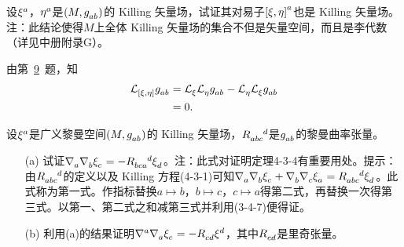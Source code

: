 \begin{xiti}
    \item 设$\tensor{\xi}{^a}$，$\tensor{\eta}{^a}$是$\left( M , \tensor{g}{_a_b}\right)$的 Killing 矢量场，试证其对易子$\tensor{\left[ \xi,\eta \right]}{^a}$也是 Killing 矢量场。注：此结论使得$M$上全体 Killing 矢量场的集合不但是矢量空间，而且是李代数（详见中册附录G）。

    \begin{zm}
    	由第~\hyperlink{4.9}{9}~题，知
    	\begin{align*}
    	\Ld{\left[\xi,\eta\right]} \tensor{g}{_a_b} &= \Ld{\xi} \Ld{\eta} \tensor{g}{_a_b} -\Ld{\eta} \Ld{\xi} \tensor{g}{_a_b} \\
    	&=0.
    	\end{align*}
    \end{zm}

	\item 设$\tensor{\xi}{^a}$是广义黎曼空间$\left(M, \tensor{g}{_a_b} \right)$的 Killing 矢量场，$\tensor{R}{_a_b_c^d}$是$\tensor{g}{_a_b}$的黎曼曲率张量。
	\begin{enumerate}
		\item[(a)] 试证$\Nabla{a}\Nabla{b}\tensor{\xi}{_c} = - \tensor{R}{_b_c_a^d}\tensor{\xi}{_d} $。注：此式对证明定理4-3-4有重要用处。提示：由$\tensor{R}{_a_b_c^d}$的定义以及 Killing 方程(4-3-1)可知$\Nabla{a} \Nabla{b} \tensor{\xi}{_c} + \Nabla{b} \Nabla{c} \tensor{\xi}{_a} = \tensor{R}{_a_b_c^d} \tensor{\xi}{_d} $。此式称为第一式。作指标替换$a\mapsto b$，$b\mapsto c$，$c\mapsto a$得第二式，再替换一次得第三式。以第一、第二式之和减第三式并利用(3-4-7)便得证。
		\item[(b)] 利用(a)的结果证明$\tensor{\nabla}{^a} \Nabla{a} \tensor{\xi}{_c} = - \tensor{R}{_c_d} \tensor{\xi}{^d} $，其中$\tensor{R}{_c_d}$是里奇张量。
	\end{enumerate}


\end{xiti}
